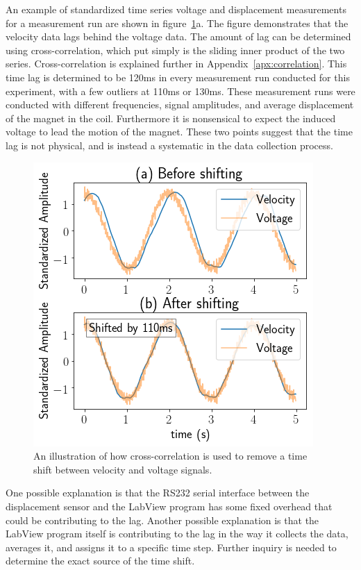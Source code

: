 \documentclass[aps,prstab,reprint,12pt]{revtex4-1}
\begin{document}
An example of standardized time series voltage and displacement measurements for a measurement run are shown in figure~\ref{fig:correlation}a. The figure demonstrates that the velocity data lags behind the voltage data. The amount of lag can be determined using cross-correlation, which put simply is the sliding inner product of the two series. Cross-correlation is explained further in Appendix~\ref{apx:correlation}.
This time lag is determined to be 120ms in every measurement run conducted for this experiment, with a few outliers at 110ms or 130ms. These measurement runs were conducted with different frequencies, signal amplitudes, and average displacement of the magnet in the coil.
Furthermore it is nonsensical to expect the induced voltage to lead the motion of the magnet. These two points suggest that the time lag is not physical, and is instead a systematic in the data collection process.

\begin{figure}[b]
    \centering
    \includegraphics[width=0.85\linewidth]{figs/data/autocorrelation.png}
    \caption{An illustration of how cross-correlation is used to remove a time shift between velocity and voltage signals.}
    \label{fig:correlation}
\end{figure}

One possible explanation is that the RS232 serial interface between the displacement sensor and the LabView program has some fixed overhead that could be contributing to the lag.
Another possible explanation is that the LabView program itself is contributing to the lag in the way it collects the data, averages it, and assigns it to a specific time step.
Further inquiry is needed to determine the exact source of the time shift.
\end{document}
